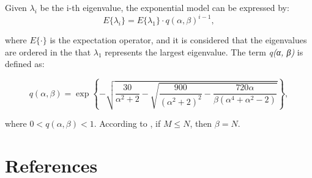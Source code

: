 \documentclass[review]{elsarticle}
\begin{document}
Given $\lambda_i$ be the i-th eigenvalue, the exponential model can be expressed by:
\begin{equation}\label{eq:eq3}
E\{\lambda_i\} = E\{\lambda_1\} \cdot q(\alpha,\beta)^{i-1},
\end{equation}

where $E\{\cdot\} $ is the expectation operator, and it is considered that the eigenvalues are ordered in the that $\lambda_1$ represents the largest eigenvalue. The term \emph{q(α, β)} is defined as:

\begin{equation}\label{eq:eq4}
q(\alpha,\beta) = \exp\left\{-\sqrt{\frac{30}{\alpha^2 + 2} - \sqrt{\frac{900}{(\alpha^2 + 2)^2} - \frac{720\alpha}{\beta(\alpha^4 + \alpha^2 - 2)}}} \right\},
\end{equation}

where $0 < q(\alpha,\beta) < 1$. According to \cite{quinlan2006model}, if $M \leq N$, then $\beta = N$.

\section*{References}


\end{document}
